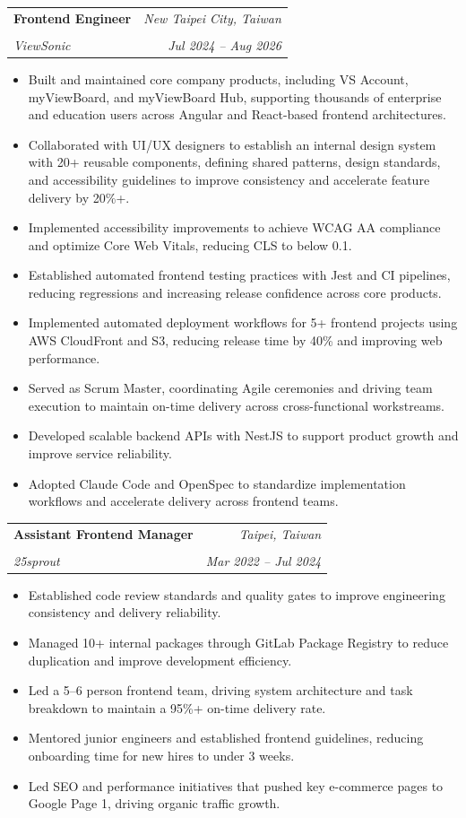 \documentclass[a4paper]{article}
\makeatletter
\newcommand{\resumeSubheading}[4]{
    \Needspace{3.5\baselineskip}
    \noindent
    \begin{tabular*}{1.0\textwidth}[t]{l@{\extracolsep{\fill}}r}
      \textbf{\large #1} & \textit{\small #3} \\
      \vspace{-8pt} \\
      \textit{\large #2} & \textit{\small #4} \\
    \end{tabular*}%
    \par\vspace{2pt}
}
\makeatother
\begin{document}
\resumeSubheading
    {Frontend Engineer}
    {ViewSonic}
    {New Taipei City, Taiwan}
    {Jul 2024 – Aug 2026}
\vspace{-1mm}
\begin{itemize} \itemsep 1pt
    \item Built and maintained core company products, including VS Account, myViewBoard, and myViewBoard Hub, supporting thousands of enterprise and education users across Angular and React-based frontend architectures.
    \item Collaborated with UI/UX designers to establish an internal design system with 20+ reusable components, defining shared patterns, design standards, and accessibility guidelines to improve consistency and accelerate feature delivery by 20\%+.
    \item Implemented accessibility improvements to achieve WCAG AA compliance and optimize Core Web Vitals, reducing CLS to below 0.1.
    \item Established automated frontend testing practices with Jest and CI pipelines, reducing regressions and increasing release confidence across core products.
    \item Implemented automated deployment workflows for 5+ frontend projects using AWS CloudFront and S3, reducing release time by 40\% and improving web performance.
    \item Served as Scrum Master, coordinating Agile ceremonies and driving team execution to maintain on-time delivery across cross-functional workstreams.
    \item Developed scalable backend APIs with NestJS to support product growth and improve service reliability.
    \item Adopted Claude Code and OpenSpec to standardize implementation workflows and accelerate delivery across frontend teams.
\end{itemize}

\resumeSubheading
    {Assistant Frontend Manager}
    {25sprout}
    {Taipei, Taiwan}
    {Mar 2022 – Jul 2024}
\vspace{-1mm}
\begin{itemize} \itemsep 1pt
    \item Established code review standards and quality gates to improve engineering consistency and delivery reliability.
    \item Managed 10+ internal packages through GitLab Package Registry to reduce duplication and improve development efficiency.
    \item Led a 5–6 person frontend team, driving system architecture and task breakdown to maintain a 95\%+ on-time delivery rate.
    \item Mentored junior engineers and established frontend guidelines, reducing onboarding time for new hires to under 3 weeks.
    \item Led SEO and performance initiatives that pushed key e-commerce pages to Google Page 1, driving organic traffic growth.
\end{itemize}
\end{document}
